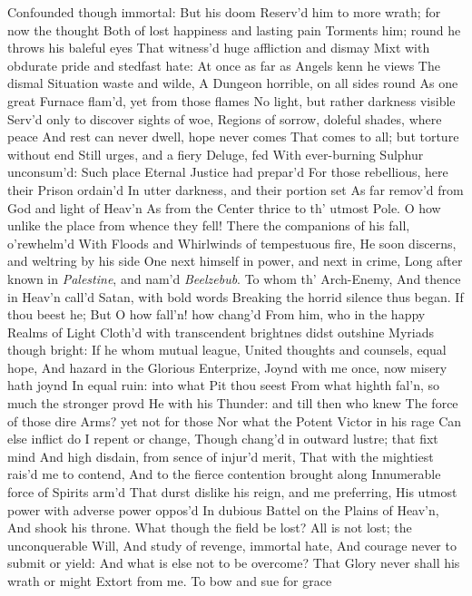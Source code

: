 \documentclass[11pt]{book}
\newcounter {last}
\begin{document}
Confounded though immortal: But his doom 
Reserv'd him to more wrath; for now the thought 
Both of lost happiness and lasting pain 
Torments him; round he throws his baleful eyes 
That witness'd huge affliction and dismay 
Mixt with obdurate pride and stedfast hate: 
At once as far as Angels kenn he views 
The dismal Situation waste and wilde, 
A Dungeon horrible, on all sides round 
As one great Furnace flam'd, yet from those flames 
No light, but rather darkness visible 
Serv'd only to discover sights of woe, 
Regions of sorrow, doleful shades, where peace 
And rest can never dwell, hope never comes 
That comes to all; but torture without end 
Still urges, and a fiery Deluge, fed 
With ever-burning Sulphur unconsum'd: 
Such place Eternal Justice had prepar'd 
For those rebellious, here their Prison ordain'd 
In utter darkness, and their portion set 
As far remov'd from God and light of Heav'n 
As from the Center thrice to th' utmost Pole. 
O how unlike the place from whence they fell! 
There the companions of his fall, o'rewhelm'd 
With Floods and Whirlwinds of tempestuous fire, 
He soon discerns, and weltring by his side 
One next himself in power, and next in crime, 
Long after known in \textit{Palestine}, and nam'd 
\textit{Beelzebub}.  To whom th' Arch-Enemy, 
And thence in Heav'n call'd Satan, with bold words 
Breaking the horrid silence thus began. 
\quad If thou beest he; But O how fall'n! how chang'd 
From him, who in the happy Realms of Light 
Cloth'd with transcendent brightnes didst outshine 
Myriads though bright: If he whom mutual league, 
United thoughts and counsels, equal hope, 
And hazard in the Glorious Enterprize, 
Joynd with me once, now misery hath joynd 
In equal ruin: into what Pit thou seest 
From what highth fal'n, so much the stronger provd 
He with his Thunder: and till then who knew 
The force of those dire Arms? yet not for those 
Nor what the Potent Victor in his rage 
Can else inflict do I repent or change, 
Though chang'd in outward lustre; that fixt mind 
And high disdain, from sence of injur'd merit, 
That with the mightiest rais'd me to contend, 
And to the fierce contention brought along 
Innumerable force of Spirits arm'd 
That durst dislike his reign, and me preferring, 
His utmost power with adverse power oppos'd 
In dubious Battel on the Plains of Heav'n, 
And shook his throne.  What though the field be lost? 
All is not lost; the unconquerable Will, 
And study of revenge, immortal hate, 
And courage never to submit or yield: 
And what is else not to be overcome? 
That Glory never shall his wrath or might 
Extort from me.  To bow and sue for grace 
\end{document}

